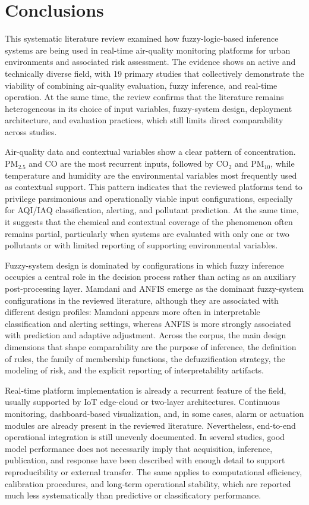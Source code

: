 \section{Conclusions}

This systematic literature review examined how fuzzy-logic-based inference systems are being used in real-time air-quality monitoring platforms for urban environments and associated risk assessment. The evidence shows an active and technically diverse field, with 19 primary studies that collectively demonstrate the viability of combining air-quality evaluation, fuzzy inference, and real-time operation. At the same time, the review confirms that the literature remains heterogeneous in its choice of input variables, fuzzy-system design, deployment architecture, and evaluation practices, which still limits direct comparability across studies.

Air-quality data and contextual variables show a clear pattern of concentration. PM$_{2.5}$ and CO are the most recurrent inputs, followed by CO$_2$ and PM$_{10}$, while temperature and humidity are the environmental variables most frequently used as contextual support. This pattern indicates that the reviewed platforms tend to privilege parsimonious and operationally viable input configurations, especially for AQI/IAQ classification, alerting, and pollutant prediction. At the same time, it suggests that the chemical and contextual coverage of the phenomenon often remains partial, particularly when systems are evaluated with only one or two pollutants or with limited reporting of supporting environmental variables.

Fuzzy-system design is dominated by configurations in which fuzzy inference occupies a central role in the decision process rather than acting as an auxiliary post-processing layer. Mamdani and ANFIS emerge as the dominant fuzzy-system configurations in the reviewed literature, although they are associated with different design profiles: Mamdani appears more often in interpretable classification and alerting settings, whereas ANFIS is more strongly associated with prediction and adaptive adjustment. Across the corpus, the main design dimensions that shape comparability are the purpose of inference, the definition of rules, the family of membership functions, the defuzzification strategy, the modeling of risk, and the explicit reporting of interpretability artifacts.

Real-time platform implementation is already a recurrent feature of the field, usually supported by IoT edge-cloud or two-layer architectures. Continuous monitoring, dashboard-based visualization, and, in some cases, alarm or actuation modules are already present in the reviewed literature. Nevertheless, end-to-end operational integration is still unevenly documented. In several studies, good model performance does not necessarily imply that acquisition, inference, publication, and response have been described with enough detail to support reproducibility or external transfer. The same applies to computational efficiency, calibration procedures, and long-term operational stability, which are reported much less systematically than predictive or classificatory performance.

